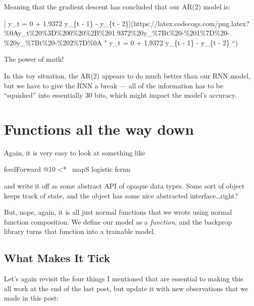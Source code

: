 \documentclass[]{article}
\newenvironment{Shaded}{}{}
\newcommand{\DecValTok}[1]{\textcolor[rgb]{0.25,0.63,0.44}{#1}}
\newcommand{\FunctionTok}[1]{\textcolor[rgb]{0.02,0.16,0.49}{#1}}
\newcommand{\NormalTok}[1]{#1}
\begin{document}
Meaning that the gradient descent has concluded that our AR(2) model is:

{[} y\_t = 0 + 1.9372 y\_\{t - 1\} - y\_\{t -
2\}{]}(https://latex.codecogs.com/png.latex?\%0Ay\_t\%20\%3D\%200\%20\%2B\%201.9372\%20y\_\%7Bt\%20-\%201\%7D\%20-\%20y\_\%7Bt\%20-\%202\%7D\%0A
" y\_t = 0 + 1.9372 y\_\{t - 1\} - y\_\{t - 2\} ``)

The power of math!

In this toy situation, the AR(2) appears to do much better than our RNN model,
but we have to give the RNN a break --- all of the information has to be
``squished'' into essentially 30 bits, which might impact the model's accuracy.

\hypertarget{functions-all-the-way-down}{%
\section{Functions all the way down}\label{functions-all-the-way-down}}

Again, it is very easy to look at something like

\begin{Shaded}
\begin{Highlighting}[]
\NormalTok{feedForward }\FunctionTok{@}\DecValTok{10} \FunctionTok{<*~}\NormalTok{ mapS logistic fcrnn}
\end{Highlighting}
\end{Shaded}

and write it off as some abstract API of opaque data types. Some sort of object
keeps track of state, and the object has some nice abstracted
interface\ldots{}right?

But, nope, again, it is all just normal functions that we wrote using normal
function composition. We define our model as a \emph{function}, and the backprop
library turns that function into a trainable model.

\hypertarget{what-makes-it-tick}{%
\subsection{What Makes It Tick}\label{what-makes-it-tick}}

Let's again revisit the four things I mentioned that are essential to making
this all work at the end of the last post, but update it with new observations
that we made in this post:
\end{document}
